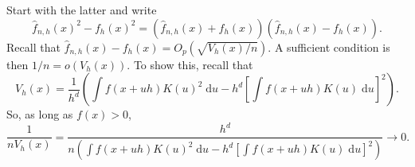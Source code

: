 Start with the latter and write
\begin{equation*}
  \widehat{f}_{n, h} (x)^{2} - f_{h} (x)^{2} = \left( \widehat{f}_{n, h} (x) +
  f_{h} (x) \right) \left( \widehat{f}_{n, h} (x) - f_{h} (x) \right).
\end{equation*}
Recall that \(\widehat{f}_{n, h} (x) - f_{h} (x) = O_{p} \left( \sqrt{V_{h} (x)
/ n} \right)\).
A sufficient condition is then \(1 / n = o \left( V_{h} (x) \right)\).
To show this, recall that
\begin{equation*}
  V_{h} (x) = \frac{1}{h^{d}} \left( \int f (x + u h) K (u)^{2} \; \mathrm{d} u
  - h^{d} \left[ \int f (x + u h) K (u) \; \mathrm{d} u \right]^{2} \right).
\end{equation*}
So, as long as \(f (x) > 0\),
\begin{equation*}
  \frac{1}{n V_{h} (x)} = \frac{h^{d}}{n \left( \int f (x + u h) K
  (u)^{2} \; \mathrm{d} u - h^{d} \left[ \int f (x + u h) K (u) \; \mathrm{d} u
  \right]^{2} \right)} \to 0.
\end{equation*}

